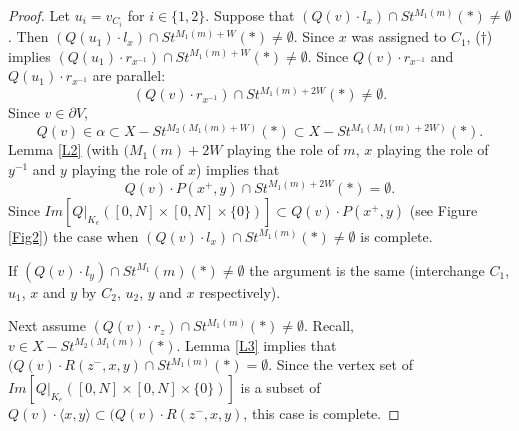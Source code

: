 \documentclass[10pt,a4paper]{amsart}
\begin{document}
\begin{proof} Let $u_i=v_{C_i}$ for $i\in\{1,2\}$. Suppose that $(Q(v)\cdot l_x)\cap St^{M_1(m)}(\ast)\ne\emptyset$. 
Then $(Q(u_1)\cdot l_x)\cap St^{M_1(m)+W}(\ast)\ne \emptyset$. Since $x$ was assigned to $C_1$, ($\dagger$) implies $(Q(u_1)\cdot r_{x^{-1}})\cap St^{M_1(m)+W}(\ast)\ne \emptyset$. Since $Q(v)\cdot r_{x^{-1}}$ and $Q(u_1)\cdot r_{x^{-1}}$ are parallel: 
$$(Q(v)\cdot r_{x^{-1}})\cap St^{M_1(m)+2W}(\ast)\ne \emptyset.$$ 
Since $v\in \partial V$, 
$$Q(v)\in \alpha\subset X-St^{M_2(M_1(m)+W)}(\ast)\subset X-St^{M_1(M_1(m)+2W)}(\ast).$$ 
Lemma \ref{L2} (with $(M_1(m)+2W$ playing the role of $m$, $x$ playing the role of $y^{-1}$ and $y$ playing the role of $x$) implies that 
$$Q(v)\cdot P(x^+,y)\cap St^{M_1(m)+2W}(\ast)=\emptyset.$$ 
Since  $Im[Q|_{K_e}([0,N]\times [0,N]\times\{0\})]\subset Q(v)\cdot P(x^+,y)$ (see Figure \ref{Fig2}) the case when $(Q(v)\cdot l_x)\cap St^{M_1(m)}(\ast)\ne\emptyset$ is complete. 

If $(Q(v)\cdot l_y)\cap St^{M_1}(m)(\ast)\ne \emptyset$ the argument is the same (interchange  $C_1$, $u_1$, $x$ and $y$ by $C_2$, $u_2$, $y$ and $x$ respectively). 

Next assume $(Q(v)\cdot r_z)\cap St^{M_1(m)}(\ast)\ne \emptyset$. Recall, $v\in X-St^{M_2(M_1(m))}(\ast)$. Lemma \ref{L3} implies that $(Q(v)\cdot R(z^-,x,y)\cap St^{M_1(m)}(\ast)=\emptyset$. Since the vertex set of $Im[Q|_{K_e}([0,N]\times [0,N]\times\{0\})]$ is a subset of $Q(v)\cdot \langle x,y\rangle\subset 
(Q(v)\cdot R(z^-,x,y)$, this case is complete. 
\end{proof}
\end{document}
